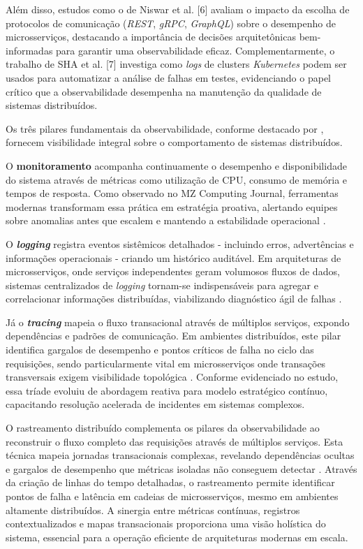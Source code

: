 Além disso, estudos como o de Niswar et al. [6] avaliam o impacto da escolha de protocolos de comunicação (\textit{REST}, \textit{gRPC}, \textit{GraphQL}) sobre o desempenho de microsserviços, destacando a importância de decisões arquitetônicas bem-informadas para garantir uma observabilidade eficaz. Complementarmente, o trabalho de SHA et al. [7] investiga como \textit{logs} de clusters \textit{Kubernetes} podem ser usados para automatizar a análise de falhas em testes, evidenciando o papel crítico que a observabilidade desempenha na manutenção da qualidade de sistemas distribuídos.

Os três pilares fundamentais da observabilidade, conforme destacado por \cite{sandeep2022observability}, fornecem visibilidade integral sobre o comportamento de sistemas distribuídos.

O \textbf{monitoramento} acompanha continuamente o desempenho e disponibilidade do sistema através de métricas como utilização de CPU, consumo de memória e tempos de resposta. Como observado no MZ Computing Journal, ferramentas modernas transformam essa prática em estratégia proativa, alertando equipes sobre anomalias antes que escalem e mantendo a estabilidade operacional \cite{sandeep2022observability}.

O \textit{\textbf{logging}} registra eventos sistêmicos detalhados - incluindo erros, advertências e informações operacionais - criando um histórico auditável. Em arquiteturas de microsserviços, onde serviços independentes geram volumosos fluxos de dados, sistemas centralizados de \textit{logging} tornam-se indispensáveis para agregar e correlacionar informações distribuídas, viabilizando diagnóstico ágil de falhas \cite{sandeep2022observability}.

Já o \textit{\textbf{tracing}} mapeia o fluxo transacional através de múltiplos serviços, expondo dependências e padrões de comunicação. Em ambientes distribuídos, este pilar identifica gargalos de desempenho e pontos críticos de falha no ciclo das requisições, sendo particularmente vital em microsserviços onde transações transversais exigem visibilidade topológica \cite{sandeep2022observability}. Conforme evidenciado no estudo, essa tríade evoluiu de abordagem reativa para modelo estratégico contínuo, capacitando resolução acelerada de incidentes em sistemas complexos.

O rastreamento distribuído complementa os pilares da observabilidade ao reconstruir o fluxo completo das requisições através de múltiplos serviços. Esta técnica mapeia jornadas transacionais complexas, revelando dependências ocultas e gargalos de desempenho que métricas isoladas não conseguem detectar \cite{sandeep2022observability}. Através da criação de linhas do tempo detalhadas, o rastreamento permite identificar pontos de falha e latência em cadeias de microsserviços, mesmo em ambientes altamente distribuídos. A sinergia entre métricas contínuas, registros contextualizados e mapas transacionais proporciona uma visão holística do sistema, essencial para a operação eficiente de arquiteturas modernas em escala.

